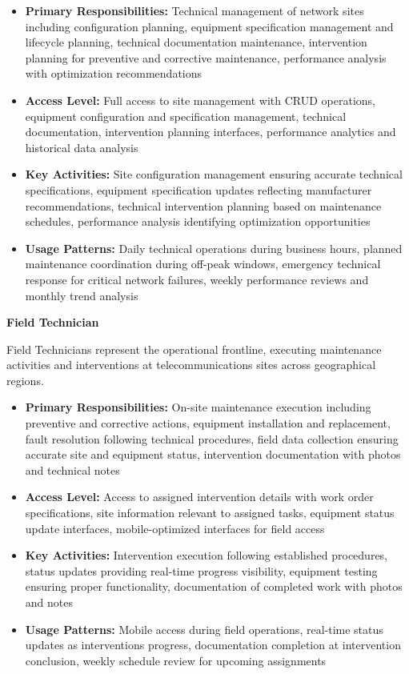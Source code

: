 \begin{itemize}
\item \textbf{Primary Responsibilities:} Technical management of network sites including configuration planning, equipment specification management and lifecycle planning, technical documentation maintenance, intervention planning for preventive and corrective maintenance, performance analysis with optimization recommendations
\item \textbf{Access Level:} Full access to site management with CRUD operations, equipment configuration and specification management, technical documentation, intervention planning interfaces, performance analytics and historical data analysis
\item \textbf{Key Activities:} Site configuration management ensuring accurate technical specifications, equipment specification updates reflecting manufacturer recommendations, technical intervention planning based on maintenance schedules, performance analysis identifying optimization opportunities
\item \textbf{Usage Patterns:} Daily technical operations during business hours, planned maintenance coordination during off-peak windows, emergency technical response for critical network failures, weekly performance reviews and monthly trend analysis
\end{itemize}

\textbf{Field Technician}

Field Technicians represent the operational frontline, executing maintenance activities and interventions at telecommunications sites across geographical regions.

\begin{itemize}
\item \textbf{Primary Responsibilities:} On-site maintenance execution including preventive and corrective actions, equipment installation and replacement, fault resolution following technical procedures, field data collection ensuring accurate site and equipment status, intervention documentation with photos and technical notes
\item \textbf{Access Level:} Access to assigned intervention details with work order specifications, site information relevant to assigned tasks, equipment status update interfaces, mobile-optimized interfaces for field access
\item \textbf{Key Activities:} Intervention execution following established procedures, status updates providing real-time progress visibility, equipment testing ensuring proper functionality, documentation of completed work with photos and notes
\item \textbf{Usage Patterns:} Mobile access during field operations, real-time status updates as interventions progress, documentation completion at intervention conclusion, weekly schedule review for upcoming assignments
\end{itemize}

